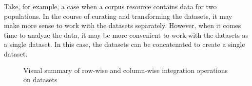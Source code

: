 \documentclass[
  letterpaper,
]{latex/krantz}
\theoremstyle{definition}
\theoremstyle{remark}
\begin{document}
Take, for example, a case when a corpus resource contains data for two
populations. In the course of curating and transforming the datasets, it
may make more sense to work with the datasets separately. However, when
it comes time to analyze the data, it may be more convenient to work
with the datasets as a single dataset. In this case, the datasets can be
concatenated to create a single dataset.

\begin{figure}[H]

\begin{minipage}{0.50\linewidth}



\end{minipage}%
%
\begin{minipage}{0.50\linewidth}



\end{minipage}%

\caption{\label{fig-ud-integration}Visual summary of row-wise and
column-wise integration operations on datasets}

\end{figure}%
\end{document}
